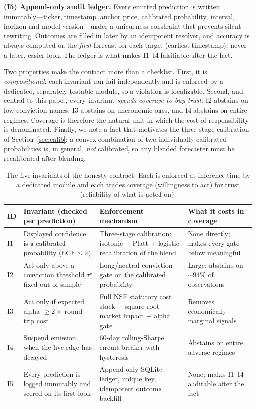 \documentclass[conference]{IEEEtran}
\begin{document}
\smallskip\noindent\textbf{(I5) Append-only audit ledger.} Every emitted prediction
is written immutably---ticker, timestamp, anchor price, calibrated probability,
interval, horizon and model version---under a uniqueness constraint that prevents
silent rewriting. Outcomes are filled in later by an idempotent resolver, and
accuracy is always computed on the \emph{first} forecast for each target (earliest
timestamp), never a later, easier look. The ledger is what makes I1--I4 falsifiable
after the fact.

\smallskip
Two properties make the contract more than a checklist. First, it is
\emph{compositional}: each invariant can fail independently and is enforced by a
dedicated, separately testable module, so a violation is localizable. Second, and
central to this paper, every invariant \emph{spends coverage to buy trust}: I2
abstains on low-conviction names, I3 abstains on uneconomic ones, and I4 abstains
on entire regimes. Coverage is therefore the natural unit in which the cost of
responsibility is denominated. Finally, we note a fact that motivates the
three-stage calibration of Section~\ref{sec:calib}: a convex combination of two
individually calibrated probabilities is, in general, \emph{not} calibrated, so any
blended forecaster must be recalibrated after blending.

\begin{table}[t]
\centering
\caption{The five invariants of the honesty contract. Each is enforced at
inference time by a dedicated module and each trades coverage (willingness to act)
for trust (reliability of what is acted on).}
\label{tab:contract}
\renewcommand{\arraystretch}{1.25}
\begin{tabular}{@{}p{} p{} p{} p{}@{}}
\toprule
\textbf{ID} & \textbf{Invariant (checked per prediction)} & \textbf{Enforcement mechanism} & \textbf{What it costs in coverage} \\
\midrule
I1 & Displayed confidence is a calibrated probability ($\mathrm{ECE}\le\varepsilon$) & Three-stage calibration: isotonic $+$ Platt $+$ logistic recalibration of the blend & None directly; makes every gate below meaningful \\
I2 & Act only above a conviction threshold $\tau^\star$ fixed out of sample & Long/neutral conviction gate on the calibrated probability & Large: abstains on $\sim$94\% of observations \\
I3 & Act only if expected alpha $\ge 2\times$ round-trip cost & Full NSE statutory cost stack $+$ square-root market impact $+$ alpha gate & Removes economically marginal signals \\
I4 & Suspend emission when the live edge has decayed & 60-day rolling-Sharpe circuit breaker with hysteresis & Abstains on entire adverse regimes \\
I5 & Every prediction is logged immutably and scored on its first look & Append-only SQLite ledger, unique key, idempotent outcome backfill & None; makes I1--I4 auditable after the fact \\
\bottomrule
\end{tabular}
\end{table}
\end{document}

